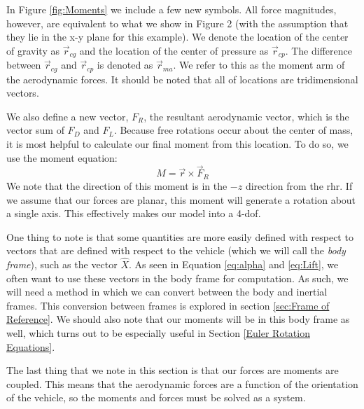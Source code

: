 \documentclass[12pt]{report}
\begin{document}
In Figure \ref{fig:Moments} we include a few new symbols. All force magnitudes, however, are equivalent to what we show in Figure 2 (with the assumption that they lie in the x-y plane for this example). We denote the location of the center of gravity as $\vec{r}_{cg}$ and the location of the center of pressure as $\vec{r}_{cp}$. The difference between $\vec{r}_{cg}$ and $\vec{r}_{cp}$ is denoted as $\vec{r}_{ma}$. We refer to this as the moment arm of the aerodynamic forces. It should be noted that all of locations are tridimensional vectors. 

We also define a new vector, $F_R$, the resultant aerodynamic vector, which is the vector sum of $F_D$ and $F_L$. Because free rotations occur about the center of mass, it is most helpful to calculate our final moment from this location. To do so, we use the moment equation:
$$M=\vec{r}\times \vec{F}_R$$
We note that the direction of this moment is in the $-\hat{z}$ direction from the \gls{rhr}. If we assume that our forces are planar, this moment will generate a rotation about a single axis. This effectively makes our model into a 4-\gls{dof}.

One thing to note is that some quantities are more easily defined with respect to vectors that are defined with respect to the vehicle (which we will call the \textit{body frame}), such as the vector $\hat{X}$. As seen in Equation \eqref{eq:alpha} and \eqref{eq:Lift}, we often want to use these vectors in the body frame for computation. As such, we will need a method in which we can convert between the body and inertial frames. This conversion between frames is explored in section \ref{sec:Frame of Reference}. We should also note that our moments will be in this body frame as well, which turns out to be especially useful in Section \ref{Euler Rotation Equations}.

The last thing that we note in this section is that our forces are moments are coupled. This means that the aerodynamic forces are a function of the orientation of the vehicle, so the moments and forces must be solved as a system.
\end{document}
